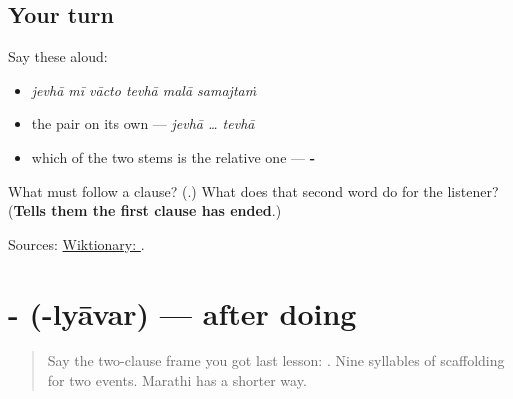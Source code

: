 \subsection*{Your turn}
Say these aloud:

\begin{itemize}
\raggedright
  \item \emph{jevhā mī vācto tevhā malā samajtaṁ}
  \item the pair on its own — \emph{jevhā … tevhā}
  \item which of the two stems is the relative one — \textbf{-}
\end{itemize}

\begin{tcolorbox}[breakable,colback=teal!4,colframe=teal!35!black,title={Before you move on}]
What must follow a \textbf{} clause? (\textbf{}.) What does that second word do for the listener? (\textbf{Tells them the first clause has ended}.)

Sources: \href{https://en.wiktionary.org/wiki/\%E0\%A4\%9C\%E0\%A5\%87\%E0\%A4\%B5\%E0\%A5\%8D\%E0\%A4\%B9\%E0\%A4\%BE}{Wiktionary: }.
\end{tcolorbox}
\section[\texorpdfstring{-\mr{ल्यावर} (-lyāvar)}{-ल्यावर (-lyāvar)}]{- (-lyāvar) — after doing}

\label{lesson:MR-C36-lyaavar}



\begin{quote}
Say the two-clause frame you got last lesson: \textbf{     }. Nine syllables of scaffolding for two events. Marathi has a shorter way.
\end{quote}

